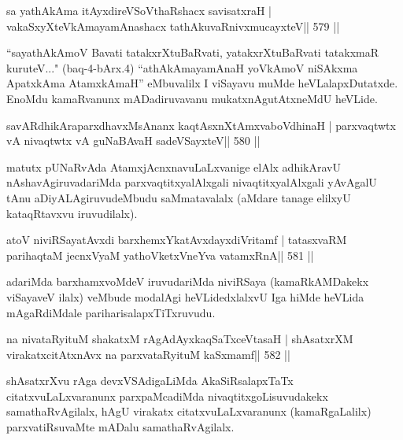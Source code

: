 

\begin{shl}
sa yathAkAma itAyxdireVSoV\s thaRshacx savisatxraH |
vakaSxyXteV\s kAmayamAnashacx tathA\s kuvaRnivxmucayxteV\hfill || 579 ||
\end{shl}

\begin{artha}
``sayathAkAmoV Bavati tatakxrXtuBaRvati, yatakxrXtuBaRvati tatakxmaR
kuruteV..." (baq-4-bArx.4) ``athA\s kAmayamAnaH yoV\s kAmoV
niSAkxma ApatxkAma AtamxkAmaH'' eMbuvalilx I viSayavu muMde
heVLalapxDutatxde. EnoMdu kamaRvanunx mADadiruvavanu
mukatxnAgutAtxneMdU heVLide.
\end{artha}

\begin{shl}
savARdhikAraparxdhavxMsAnanx kaqtAsxnXtAmxvaboVdhinaH |
parxvaqtwtx vA nivaqtwtx vA guNaBAvaH sadeVSayxteV\hfill || 580 ||
\end{shl}

\begin{artha}
matutx pUNaRvAda AtamxjAcnxnavuLaLxvanige elAlx adhikAravU nAshavAgiruvadariMda parxvaqtitxyalAlxgali nivaqtitxyalAlxgali yAvAgalU tAnu aDiyALAgiruvudeMbudu saMmatavalalx (aMdare tanage elilxyU kataqRtavxvu iruvudilalx).
\end{artha}

\begin{shl}
atoV niviRSayatAvxdi barxhemxYkatAvxdayxdiVritamf |
tatasxvaRM parihaqtaM jecnxVyaM yathoVketxVneYva vatamxRnA\hfill || 581 ||
\end{shl}

\begin{artha}
adariMda barxhamxvoMdeV iruvudariMda niviRSaya (kamaRkAMDakekx viSayaveV ilalx) veMbude modalAgi heVLidedxlalxvU Iga hiMde heVLida mAgaRdiMdale pariharisalapxTiTxruvudu.
\end{artha}



\begin{shl}
na nivataRyituM shakatxM rAgAdAyxkaqSaTxceVtasaH |
shAsatxrXM virakatxcitAtxnAvx na parxvataRyituM kaSxmamf\hfill || 582 ||
\end{shl}

\begin{artha}
shAsatxrXvu rAga devxVSAdigaLiMda AkaSiRsalapxTaTx citatxvuLaLxvaranunx  parxpaMcadiMda nivaqtitxgoLisuvudakekx samathaRvAgilalx, hAgU virakatx citatxvuLaLxvaranunx (kamaRgaLalilx) parxvatiRsuvaMte mADalu samathaRvAgilalx.
\end{artha}

